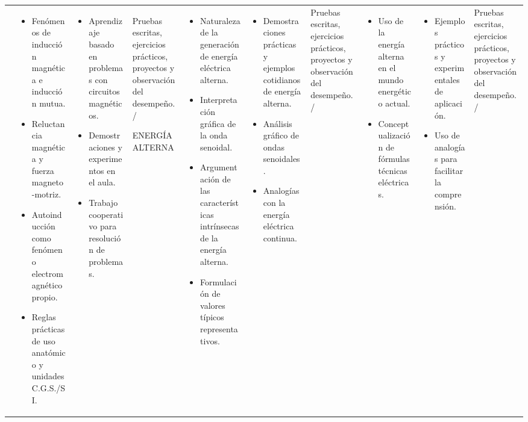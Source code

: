 \documentclass[a4paper,12pt]{article}
\begin{document}
\begin{longtable}{|p{4cm}|p{8cm}|p{8cm}|p{4cm}|}
  \phantom{X} &
  \begin{itemize}[leftmargin=*, nosep]
    \item Fenómenos de inducción magnética e inducción mutua.
    \item Reluctancia magnética y fuerza magneto-motriz.
    \item Autoinducción como fenómeno electromagnético propio.
    \item Reglas prácticas de uso anatómico y unidades C.G.S./SI.
  \end{itemize} &
  \begin{itemize}[leftmargin=*, nosep]
    \item Aprendizaje basado en problemas con circuitos magnéticos.
    \item Demostraciones y experimentos en el aula.
    \item Trabajo cooperativo para resolución de problemas.
  \end{itemize} &
  Pruebas escritas, ejercicios prácticos, proyectos y observación del
  desempeño. /
  \hline

  ENERGÍA ALTERNA &
  \begin{itemize}[leftmargin=*, nosep]
    \item Naturaleza de la generación de energía eléctrica alterna.
    \item Interpretación gráfica de la onda senoidal.
    \item Argumentación de las características intrínsecas de la
      energía alterna.
    \item Formulación de valores típicos representativos.
  \end{itemize} &
  \begin{itemize}[leftmargin=*, nosep]
    \item Demostraciones prácticas y ejemplos cotidianos de energía alterna.
    \item Análisis gráfico de ondas senoidales.
    \item Analogías con la energía eléctrica continua.
  \end{itemize} &
  Pruebas escritas, ejercicios prácticos, proyectos y observación del
  desempeño. /
  \hline

  \phantom{X} &
  \begin{itemize}[leftmargin=*, nosep]
    \item Uso de la energía alterna en el mundo energético actual.
    \item Conceptualización de fórmulas técnicas eléctricas.
  \end{itemize} &
  \begin{itemize}[leftmargin=*, nosep]
    \item Ejemplos prácticos y experimentales de aplicación.
    \item Uso de analogías para facilitar la comprensión.
  \end{itemize} &
  Pruebas escritas, ejercicios prácticos, proyectos y observación del
  desempeño. /
  \hline
\end{longtable}\vspace{0.5cm}
\end{document}
